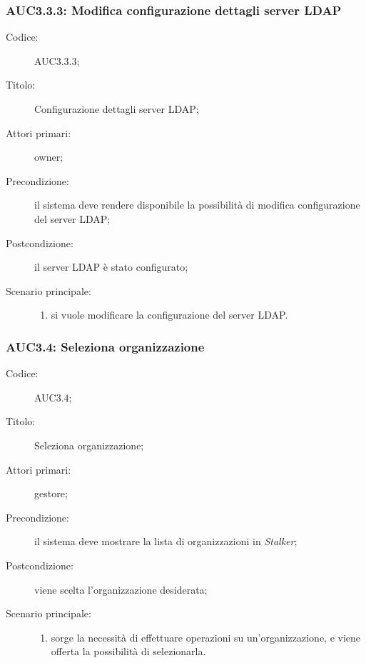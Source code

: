 \documentclass[../../../analisi-dei-requisiti.tex]{subfiles}
\begin{document}
\subsubsection{AUC3.3.3: Modifica configurazione dettagli server LDAP}%
\label{subs:AUC3.3.3}
\begin{description}
  \item[Codice:] AUC3.3.3;
  \item[Titolo:] Configurazione dettagli server LDAP;
  \item[Attori primari:] owner;
  \item[Precondizione:] il sistema deve rendere disponibile la possibilità di modifica configurazione del server LDAP;
  \item[Postcondizione:] il server LDAP è stato configurato;
  \item[Scenario principale:]
        \begin{enumerate}
          \item si vuole modificare la configurazione del server LDAP.
        \end{enumerate}
\end{description}

\subsubsection{AUC3.4: Seleziona organizzazione}%
\label{subs:AUC3.4}
\begin{description}
  \item[Codice:] AUC3.4;
  \item[Titolo:] Seleziona organizzazione;
  \item[Attori primari:] gestore;
  \item[Precondizione:] il sistema deve mostrare la lista di organizzazioni in \emph{Stalker};
  \item[Postcondizione:] viene scelta l'organizzazione desiderata;
  \item[Scenario principale:]
        \begin{enumerate}
          \item sorge la necessità di effettuare operazioni su un'organizzazione, e viene offerta la possibilità di selezionarla.
        \end{enumerate}
\end{description}
\end{document}
